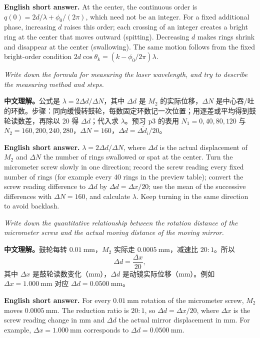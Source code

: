 \documentclass[11pt]{ctexart}
\begin{document}
\textbf{English short answer.} At the center, the continuous order is \(q(0)=2d/\lambda+\phi_0/(2\pi)\), which need not be an integer. For a fixed additional phase, increasing \(d\) raises this order; each crossing of an integer creates a bright ring at the center that moves outward (spitting). Decreasing \(d\) makes rings shrink and disappear at the center (swallowing). The same motion follows from the fixed bright-order condition \(2d\cos\theta_k=(k-\phi_0/2\pi)\lambda\).


\textit{Write down the formula for measuring the laser wavelength, and try to describe the measuring method and steps.}

\textbf{中文理解。}公式是 \(\lambda=2\Delta d/\Delta N\)，其中 \(\Delta d\) 是 \(M_2\) 的实际位移，\(\Delta N\) 是中心吞/吐的环数。步骤：同向缓慢转鼓轮，每数固定环数记一次位置；用逐差或平均得到鼓轮读数差，再除以 20 得 \(\Delta d\)；代入求 \(\lambda\)。预习 p3 的表用 \(N_1=0,40,80,120\) 与 \(N_2=160,200,240,280\)，\(\Delta N=160\)，\(\Delta d=\overline{\Delta d_i}/20\)。

\textbf{English short answer.} \(\lambda=2\Delta d/\Delta N\), where \(\Delta d\) is the actual displacement of \(M_2\) and \(\Delta N\) the number of rings swallowed or spat at the center. Turn the micrometer screw slowly in one direction; record the screw reading every fixed number of rings (for example every 40 rings in the preview table); convert the screw reading difference to \(\Delta d\) by \(\Delta d=\Delta x/20\); use the mean of the successive differences with \(\Delta N=160\), and calculate \(\lambda\). Keep turning in the same direction to avoid backlash.


\textit{Write down the quantitative relationship between the rotation distance of the micrometer screw and the actual moving distance of the moving mirror.}

\textbf{中文理解。}鼓轮每转 \(0.01\ \mathrm{mm}\)，\(M_2\) 实际走 \(0.0005\ \mathrm{mm}\)，减速比 \(20:1\)。所以
\[
\Delta d=\frac{\Delta x}{20},
\]
其中 \(\Delta x\) 是鼓轮读数变化（mm），\(\Delta d\) 是动镜实际位移（mm）。例如 \(\Delta x=1.000\ \mathrm{mm}\) 对应 \(\Delta d=0.0500\ \mathrm{mm}\)。

\textbf{English short answer.} For every \(0.01\ \mathrm{mm}\) rotation of the micrometer screw, \(M_2\) moves \(0.0005\ \mathrm{mm}\). The reduction ratio is \(20:1\), so \(\Delta d=\Delta x/20\), where \(\Delta x\) is the screw reading change in mm and \(\Delta d\) the actual mirror displacement in mm. For example, \(\Delta x=1.000\ \mathrm{mm}\) corresponds to \(\Delta d=0.0500\ \mathrm{mm}\).
\end{document}
